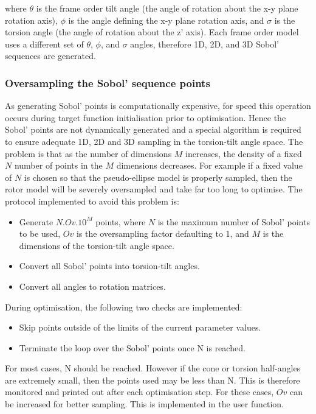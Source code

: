 where $\theta$ is the frame order tilt angle (the angle of rotation about the x-y plane rotation axis), $\phi$ is the angle defining the x-y plane rotation axis, and $\sigma$ is the torsion angle (the angle of rotation about the z' axis).
Each frame order model uses a different set of $\theta$, $\phi$, and $\sigma$ angles, therefore 1D, 2D, and 3D Sobol' sequences are generated.





\subsubsection{Oversampling the Sobol' sequence points}

As generating Sobol' points is computationally expensive, for speed this operation occurs during target function initialisation prior to optimisation.
Hence the Sobol' points are not dynamically generated and a special algorithm is required to ensure adequate 1D, 2D and 3D sampling in the torsion-tilt angle space.
The problem is that as the number of dimensions $M$ increases, the density of a fixed $N$ number of points in the $M$ dimensions decreases.
For example if a fixed value of $N$ is chosen so that the pseudo-ellipse model is properly sampled, then the rotor model will be severely oversampled and take far too long to optimise.
The protocol implemented to avoid this problem is:
\begin{itemize}
    \item Generate $N.Ov.10^M$ points, where $N$ is the maximum number of Sobol' points to be used, $Ov$ is the oversampling factor defaulting to 1, and $M$ is the dimensions of the torsion-tilt angle space.
    \item Convert all Sobol' points into torsion-tilt angles.
    \item Convert all angles to rotation matrices.
\end{itemize}

During optimisation, the following two checks are implemented:
\begin{itemize}
    \item Skip points outside of the limits of the current parameter values.
    \item Terminate the loop over the Sobol' points once N is reached.
\end{itemize}

For most cases, N should be reached.
However if the cone or torsion half-angles are extremely small, then the points used may be less than N.
This is therefore monitored and printed out after each optimisation step.
For these cases, $Ov$ can be increased for better sampling.
This is implemented in the  user function.





